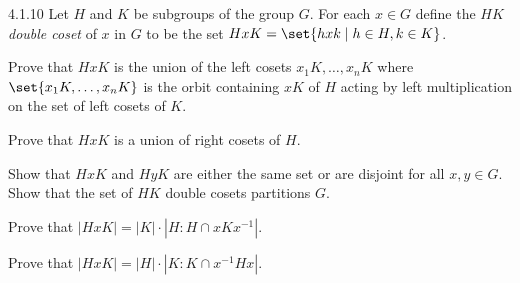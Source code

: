 \begin{spex}{4.1.10}
	Let $H$ and $K$ be subgroups of the group $G$.
	For each $x \in G$ define the $HK$ \emph{double coset} of $x$ in $G$ to be the set $HxK = \set{hxk \mid h \in H, k \in K}$.
	\begin{subexercises}
		\item Prove that $HxK$ is the union of the left cosets $x_1K, \ldots, x_nK$ where $\set{x_1K, \ldots, x_nK}$ is the orbit containing $xK$ of $H$ acting by left multiplication on the set of left cosets of $K$.
		\item Prove that $HxK$ is a union of right cosets of $H$.
		\item Show that $HxK$ and $HyK$ are either the same set or are disjoint for all $x, y \in G$.
		Show that the set of $HK$ double cosets partitions $G$.
		\item Prove that $|HxK| = |K| \cdot |H : H \cap xKx^{-1}|$.
		\item Prove that $|HxK| = |H| \cdot |K : K \cap x^{-1}Hx|$.
	\end{subexercises}
\end{spex}


